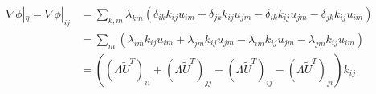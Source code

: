 \documentclass[11pt,a4paper]{article}		%
\begin{document}
\begin{equation}
\begin{aligned}
\nabla\phi|_\eta = \nabla\phi|_{ij} &= \sum_{k,m} \lambda_{km} \left( \delta_{ik} k_{ij} u_{im} + \delta_{jk} k_{ij} u_{jm} - \delta_{ik} k_{ij} u_{jm} - \delta_{jk} k_{ij} u_{im} \right)\\
&= \sum_m \left( \lambda_{im} k_{ij} u_{im} + \lambda_{jm} k_{ij} u_{jm} - \lambda_{im} k_{ij} u_{jm} - \lambda_{jm} k_{ij} u_{im} \right)\\
&= \left( ( \Lambda\tilde{U}^T )_{ii} + ( \Lambda\tilde{U}^T )_{jj} - ( \Lambda\tilde{U}^T )_{ij} - ( \Lambda\tilde{U}^T )_{ji} \right) k_{ij}
\end{aligned}
\end{equation}
\end{document}
